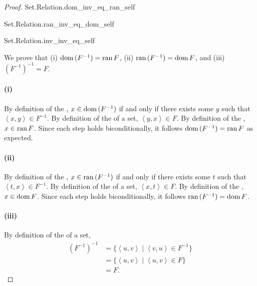\documentclass{report}
\newcommand{\pair}[1]{\left< #1 \right>}
\begin{document}
\begin{proof}

  \statementpadding

    {Set.Relation.dom\_inv\_eq\_ran\_self}

    {Set.Relation.ran\_inv\_eq\_dom\_self}

    {Set.Relation.inv\_inv\_eq\_self}

  We prove that (i) $\mathop{\text{dom}}{(F^{-1})} = \mathop{\text{ran}}{F}$, (ii) $\mathop{\text{ran}}{(F^{-1})} = \mathop{\text{dom}}{F}$,
    and (iii) $(F^{-1})^{-1} = F$.

  \paragraph{(i)}%

    By definition of the , $x \in \mathop{\text{dom}}{(F^{-1})}$ if and
      only if there exists some $y$ such that $\pair{x, y} \in F^{-1}$.
    By definition of the  of a set,
      $\pair{y, x} \in F$.
    By definition of the , $x \in \mathop{\text{ran}}{F}$.
    Since each step holds biconditionally, it follows
      $\mathop{\text{dom}}{(F^{-1})} = \mathop{\text{ran}}{F}$ as expected.

  \paragraph{(ii)}%

    By definition of the , $x \in \mathop{\text{ran}}{(F^{-1})}$ if and
      only if there exists some $t$ such that $\pair{t, x} \in F^{-1}$.
    By definition of the  of a set,
      $\pair{x, t} \in F$.
    By definition of the , $x \in \mathop{\text{dom}}{F}$.
    Since each step holds biconditionally, it follows
      $\mathop{\text{ran}}{(F^{-1})} = \mathop{\text{dom}}{F}$.

  \paragraph{(iii)}%

    By definition of the  of a set,
      \begin{align*}
        (F^{-1})^{-1}
          & = \{\pair{u, v} \mid \pair{v, u} \in F^{-1}\} \\
          & = \{\pair{u, v} \mid \pair{u, v} \in F\} \\
          & = F.
      \end{align*}

\end{proof}
\end{document}
